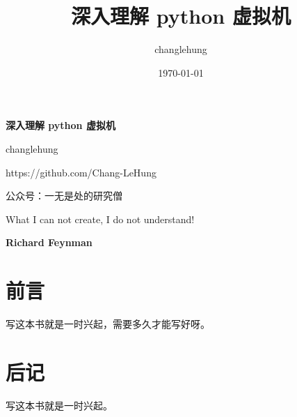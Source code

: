\documentclass[11pt]{book}
\title{\textbf{深入理解 python 虚拟机}}
\author{changlehung \affil{单位1}}
\date{\today}
\theoremstyle{mytheoremstyle}
\begin{document}
\begin{titlepage}
    \begin{center}
        \vspace{8cm}
        {\Huge\textbf{深入理解 python 虚拟机}}
        
        \vspace{1cm}
        {\Large{changlehung}}
        
        \vspace{1cm}
        {\large{https://github.com/Chang-LeHung}}
    
        \vspace{3cm}
        {\Large{公众号：一无是处的研究僧}}
    \end{center}
    \vspace{5cm}
    \epigraph{{\color{myblue} What I can not create, I do not understand!}}{\textbf{Richard Feynman}}
\end{titlepage}



\tableofcontents

\frontmatter %

\chapter{前言}
写这本书就是一时兴起，需要多久才能写好呀。

\mainmatter %




\backmatter %

\chapter{后记}
写这本书就是一时兴起。
\end{document}
